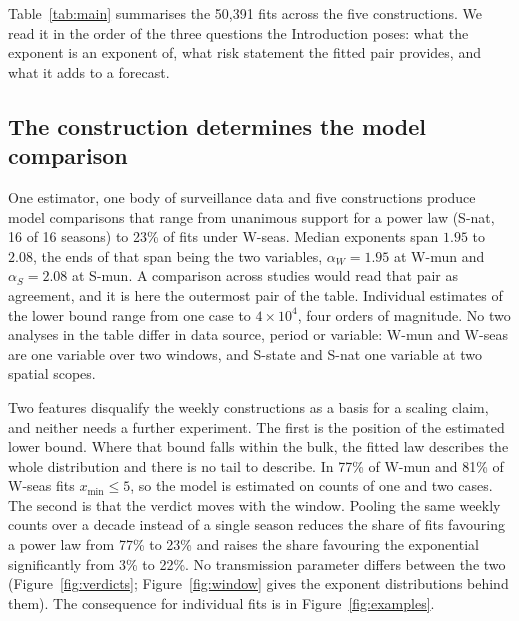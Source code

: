 \documentclass[english,10pt,b5paper]{article}
\newcommand{\lvl}[1]{\mbox{#1}}
\begin{document}
Table~\ref{tab:main} summarises the 50{,}391 fits across the five
constructions. We read it in the order of the three questions the Introduction
poses: what the exponent is an exponent of, what risk statement the fitted
pair provides, and what it adds to a forecast.

\subsection{The construction determines the model comparison}
\label{sec:verdicts}
\label{sec:size}

One estimator, one body of surveillance data and five constructions produce
model comparisons that range from unanimous support for a power law
(\lvl{S-nat}, 16 of 16 seasons) to 23\% of fits under \lvl{W-seas}. Median
exponents span $1.95$ to $2.08$, the ends of that span being the two
variables, $\alpha_W=1.95$ at \lvl{W-mun} and $\alpha_S=2.08$ at \lvl{S-mun}.
A comparison across studies would read that pair as agreement, and it is here
the outermost pair of the table. Individual estimates of the lower bound range
from one case to $4\times10^{4}$, four orders of magnitude. No two analyses in
the table differ in data source, period or variable: \lvl{W-mun} and
\lvl{W-seas} are one variable over two windows, and \lvl{S-state} and
\lvl{S-nat} one variable at two spatial scopes.



Two features disqualify the weekly constructions as a basis for a scaling
claim, and neither needs a further experiment. The first is the position of
the estimated lower bound. Where that bound falls within the bulk, the fitted
law describes the whole distribution and there is no tail to describe. In 77\%
of \lvl{W-mun} and 81\% of \lvl{W-seas} fits $x_{\min} \le 5$, so the model is
estimated on counts of one and two cases. The second is that the verdict moves
with the window. Pooling the same weekly counts over a decade instead of a
single season reduces the share of fits favouring a power law from 77\% to
23\% and raises the share favouring the exponential significantly from 3\% to
22\%. No transmission parameter differs between the two
(Figure~\ref{fig:verdicts}; Figure~\ref{fig:window} gives the exponent
distributions behind them). The consequence for individual fits is in
Figure~\ref{fig:examples}.
\end{document}
